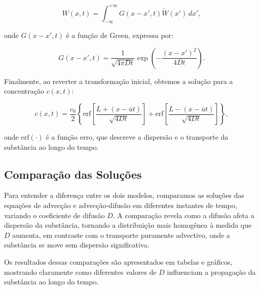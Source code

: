 \begin{equation}
    W(x, t) = \int_{-\infty}^{+\infty} G(x - x', t) \tilde{W}(x') \, dx',
\end{equation}

onde \( G(x - x', t) \) é a função de Green, expressa por:

\begin{equation}
    G(x - x', t) = \frac{1}{\sqrt{4\pi D t}} \exp\left( -\frac{(x - x')^2}{4Dt} \right).
\end{equation}

Finalmente, ao reverter a transformação inicial, obtemos a solução para a concentração \( c(x, t) \):

\begin{equation}
    c(x, t) = \frac{c_0}{2} \left\{ \text{erf} \left[ \frac{L + (x - \bar{u}t)}{\sqrt{4Dt}} \right] + \text{erf} \left[ \frac{L - (x - \bar{u}t)}{\sqrt{4Dt}} \right] \right\},
\end{equation}

onde \( \text{erf}(\cdot) \) é a função erro, que descreve a dispersão e o transporte da substância ao longo do tempo.

\subsection{Comparação das Soluções}

Para entender a diferença entre os dois modelos, comparamos as soluções das equações de advecção e advecção-difusão em diferentes instantes de tempo, variando o coeficiente de difusão \( D \). A comparação revela como a difusão afeta a dispersão da substância, tornando a distribuição mais homogênea à medida que \( D \) aumenta, em contraste com o transporte puramente advectivo, onde a substância se move sem dispersão significativa.

Os resultados dessas comparações são apresentados em tabelas e gráficos, mostrando claramente como diferentes valores de \( D \) influenciam a propagação da substância ao longo do tempo.

